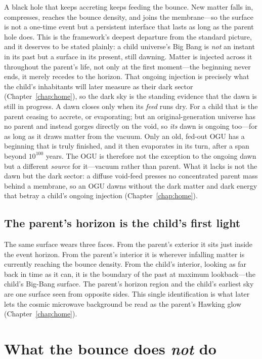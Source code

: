 A black hole that keeps accreting keeps feeding the bounce. New matter falls in,
compresses, reaches the bounce density, and joins the membrane---so the surface
is not a one-time event but a persistent interface that lasts as long as the
parent hole does. This is the framework's deepest departure from the standard
picture, and it deserves to be stated plainly: a child universe's Big Bang is
\emph{not} an instant in its past but a surface in its present, still dawning.
Matter is injected across it throughout the parent's life, not only at the first
moment---the beginning never ends, it merely recedes to the horizon. That ongoing
injection is precisely what the child's inhabitants will later measure as their
dark sector (Chapter~\ref{chap:home}), so the dark sky is the standing evidence
that the dawn is still in progress. A dawn closes only when its \emph{feed} runs dry. For a
child that is the parent ceasing to accrete, or evaporating; but an original-generation
universe has no parent and instead gorges directly on the void, so \emph{its} dawn is ongoing
too---for as long as it draws matter from the vacuum. Only an old, fed-out OGU has a beginning
that is truly finished, and it then evaporates in its turn, after a span beyond
$10^{100}$ years. The OGU is therefore not the exception to the ongoing dawn but a different
\emph{source} for it---vacuum rather than parent. What it lacks is not the dawn but the dark
sector: a diffuse void-feed presses no concentrated parent mass behind a membrane, so an OGU
dawns without the dark matter and dark energy that betray a child's ongoing injection
(Chapter~\ref{chap:home}).

\subsection{The parent's horizon is the child's first light}

The same surface wears three faces. From the parent's exterior it sits just
inside the event horizon. From the parent's interior it is wherever infalling
matter is currently reaching the bounce density. From the child's interior,
looking as far back in time as it can, it is the boundary of the past at maximum
lookback---the child's Big-Bang surface. The parent's horizon region and the
child's earliest sky are one surface seen from opposite sides. This single
identification is what later lets the cosmic microwave background be read as the
parent's Hawking glow (Chapter~\ref{chap:home}).

\section{What the bounce does \emph{not} do}
\label{sec:cpt-even}

